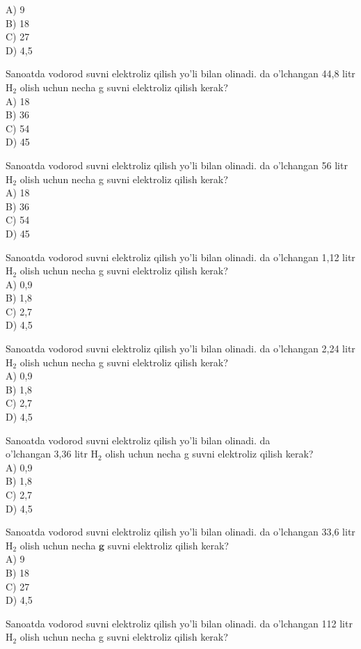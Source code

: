 A) 9\\
B) 18\\
C) 27\\
D) 4,5
  \item Sanoatda vodorod suvni elektroliz qilish yo'li bilan olinadi. da o'lchangan 44,8 litr $\mathrm{H}_{2}$ olish uchun necha g suvni elektroliz qilish kerak?\\
A) 18\\
B) 36\\
C) 54\\
D) 45
  \item Sanoatda vodorod suvni elektroliz qilish yo'li bilan olinadi. da o'lchangan 56 litr $\mathrm{H}_{2}$ olish uchun necha g suvni elektroliz qilish kerak?\\
A) 18\\
B) 36\\
C) 54\\
D) 45
  \item Sanoatda vodorod suvni elektroliz qilish yo'li bilan olinadi. da o'lchangan 1,12 litr $\mathrm{H}_{2}$ olish uchun necha g suvni elektroliz qilish kerak?\\
A) 0,9\\
B) 1,8\\
C) 2,7\\
D) 4,5
  \item Sanoatda vodorod suvni elektroliz qilish yo'li bilan olinadi. da o'lchangan 2,24 litr $\mathrm{H}_{2}$ olish uchun necha g suvni elektroliz qilish kerak?\\
A) 0,9\\
B) 1,8\\
C) 2,7\\
D) 4,5
  \item Sanoatda vodorod suvni elektroliz qilish yo'li bilan olinadi. da\\
o'lchangan 3,36 litr $\mathrm{H}_{2}$ olish uchun necha g suvni elektroliz qilish kerak?\\
A) 0,9\\
B) 1,8\\
C) 2,7\\
D) 4,5
  \item Sanoatda vodorod suvni elektroliz qilish yo'li bilan olinadi. da o'lchangan 33,6 litr $\mathrm{H}_{2}$ olish uchun necha $\mathbf{g}$ suvni elektroliz qilish kerak?\\
A) 9\\
B) 18\\
C) 27\\
D) 4,5
  \item Sanoatda vodorod suvni elektroliz qilish yo'li bilan olinadi. da o'lchangan 112 litr $\mathrm{H}_{2}$ olish uchun necha g suvni elektroliz qilish kerak?\\

